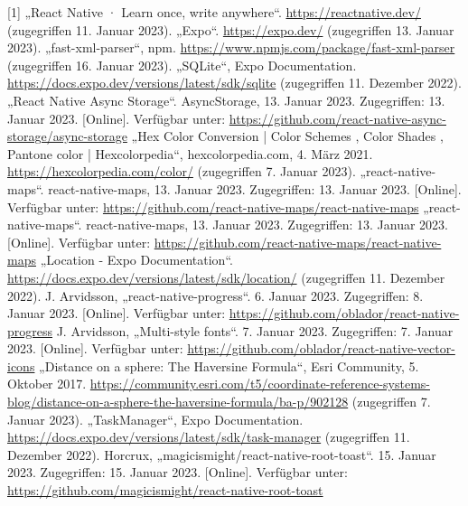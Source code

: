 \documentclass[12pt,oneside]{report}
\begin{document}
  \begin{thebibliography}{10}
     [1] „React Native · Learn once, write anywhere“. \url{https://reactnative.dev/} (zugegriffen 11. Januar 2023).
     „Expo“. \url{https://expo.dev/} (zugegriffen 13. Januar 2023).
     „fast-xml-parser“, npm. \url{https://www.npmjs.com/package/fast-xml-parser} (zugegriffen 16. Januar 2023).
     „SQLite“, Expo Documentation. \url{https://docs.expo.dev/versions/latest/sdk/sqlite} (zugegriffen 11. Dezember 2022).
     „React Native Async Storage“. AsyncStorage, 13. Januar 2023. Zugegriffen: 13. Januar 2023. [Online]. Verfügbar unter: \url{https://github.com/react-native-async-storage/async-storage}
     „Hex Color Conversion | Color Schemes , Color Shades , Pantone color | Hexcolorpedia“, hexcolorpedia.com, 4. März 2021. \url{https://hexcolorpedia.com/color/} (zugegriffen 7. Januar 2023).
     „react-native-maps“. react-native-maps, 13. Januar 2023. Zugegriffen: 13. Januar 2023. [Online]. Verfügbar unter: \url{https://github.com/react-native-maps/react-native-maps}
     „react-native-maps“. react-native-maps, 13. Januar 2023. Zugegriffen: 13. Januar 2023. [Online]. Verfügbar unter: \url{https://github.com/react-native-maps/react-native-maps}
     „Location - Expo Documentation“. \url{https://docs.expo.dev/versions/latest/sdk/location/} (zugegriffen 11. Dezember 2022).
     J. Arvidsson, „react-native-progress“. 6. Januar 2023. Zugegriffen: 8. Januar 2023. [Online]. Verfügbar unter: \url{https://github.com/oblador/react-native-progress}
     J. Arvidsson, „Multi-style fonts“. 7. Januar 2023. Zugegriffen: 7. Januar 2023. [Online]. Verfügbar unter: \url{https://github.com/oblador/react-native-vector-icons}
     „Distance on a sphere: The Haversine Formula“, Esri Community, 5. Oktober 2017. \url{https://community.esri.com/t5/coordinate-reference-systems-blog/distance-on-a-sphere-the-haversine-formula/ba-p/902128} (zugegriffen 7. Januar 2023).
     „TaskManager“, Expo Documentation. \url{https://docs.expo.dev/versions/latest/sdk/task-manager} (zugegriffen 11. Dezember 2022).
     Horcrux, „magicismight/react-native-root-toast“. 15. Januar 2023. Zugegriffen: 15. Januar 2023. [Online]. Verfügbar unter: \url{https://github.com/magicismight/react-native-root-toast}

\end{thebibliography}
\end{document}
